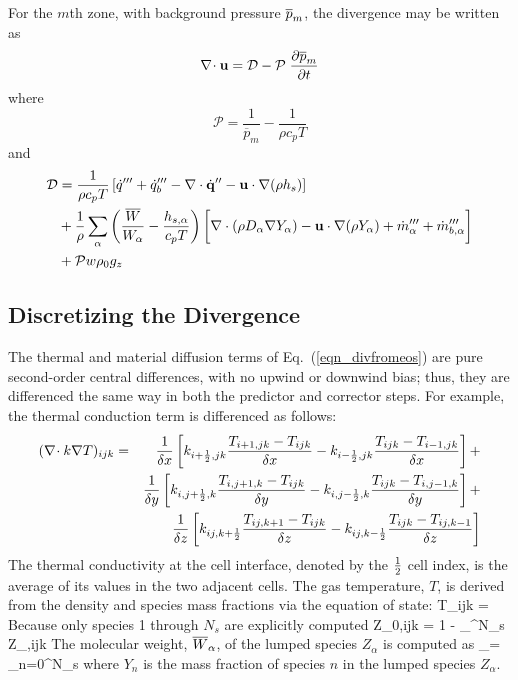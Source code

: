 For the $m$th zone, with background pressure $\overline{p}_m$, the divergence may be written as
\begin{equation}
\label{eqn_divfromeos}
\nabla\!\cdot {\bf u} = {\cal D} - {\cal P}\; \frac{\partial \overline{p}_m}{\partial t}
\end{equation}
where
\begin{equation}
\label{eqn_fdsP1}
\mathcal{P} = \frac{1}{\overline{p}_m} - \frac{1}{\rho c_p T}
\end{equation}
and
\begin{align}
\label{eqn_fdsD1}
\mathcal{D} &= \frac{1}{\rho c_p T}\left[ \dot{q}^{\prime\prime\prime} + \dot{q}_b^{\prime\prime\prime} - \nabla\cdot \dot{\mathbf{q}}^{\prime\prime} - \mathbf{u} \cdot\nabla (\rho h_s) \right] \notag\\
&+ \frac{1}{\rho} \sum_\alpha \left(\frac{\overline{W}}{W_\alpha} - \frac{h_{s,\alpha}}{c_p T} \right) \bigg[ \nabla\cdot (\rho D_\alpha \nabla Y_\alpha) - \mathbf{u} \cdot \nabla (\rho Y_\alpha) +\dot{m}_\alpha^{\prime\prime\prime} + \dot{m}_{b,\alpha}^{\prime\prime\prime} \bigg] \notag\\
&+ {\cal P} w \rho_0 g_z
\end{align}

\subsection{Discretizing the Divergence}
\label{div_discret}

The thermal and material diffusion terms of Eq.~(\ref{eqn_divfromeos}) are pure second-order central differences,
with no upwind or downwind bias; thus, they are differenced the same
way in both the predictor and corrector steps. For example, the thermal
conduction term is differenced as follows:
\begin{eqnarray}
(\nabla\!\cdot k \nabla T)_{ijk} &=&
              \frac{1}{\delta x}
         \left[k_{i+\frac{1}{2},jk}\frac{T_{i+1,jk}-T_{ijk}}{\delta x}
              -k_{i-\frac{1}{2},jk}\frac{T_{ijk}-T_{i-1,jk}}{\delta x}\right]+  \nonumber \\
            &&\frac{1}{\delta y}
         \left[k_{i,j+\frac{1}{2},k}\frac{T_{i,j+1,k}-T_{ijk}}{\delta y}
              -k_{i,j-\frac{1}{2},k}\frac{T_{ijk}-T_{i,j-1,k}}{\delta y}\right]+ \nonumber \\
            &&\frac{1}{\delta z}
         \left[k_{ij,k+\frac{1}{2}}\frac{T_{ij,k+1}-T_{ijk}}{\delta z}
              -k_{ij,k-\frac{1}{2}}\frac{T_{ijk}-T_{ij,k-1}}{\delta z}\right]
\end{eqnarray}
The thermal conductivity at the cell interface, denoted by the $\frac{1}{2}$ cell index, is the average of its values in the two adjacent cells.
The gas temperature, $T$, is derived from the density and species mass fractions via the equation of state:
\be T_{ijk} = \ee
Because only species 1 through $N_s$ are explicitly computed
\be Z_{0,ijk} =  1 -  \sum_{}^{N_s} Z_{\alpha,ijk} \ee
The molecular weight, $\overline{W}_\alpha$, of the lumped species $Z_\alpha$ is computed as
\be \bW_\alpha =  \sum_{n=0}^{N_s}  \ee
where $Y_n$ is the mass fraction of species $n$ in the lumped species $Z_\alpha$.


